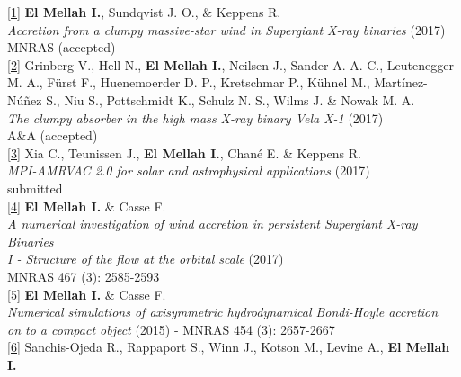 \begin{flushleft}

\href{http://adsabs.harvard.edu/abs/2017arXiv171108709E}{[1]} \textbf{El Mellah I.}, Sundqvist J. O., \& Keppens R. \\ 
\emph{Accretion from a clumpy massive-star wind in Supergiant X-ray binaries} (2017) \\
MNRAS (accepted)\\
\vspace*{0.3cm}
\href{http://adsabs.harvard.edu/abs/2017arXiv171106743G}{[2]} Grinberg V., Hell N., \textbf{El Mellah I.}, Neilsen J., Sander A. A. C., Leutenegger M. A., F\"{u}rst F., Huenemoerder D. P., Kretschmar P., K\"{u}hnel M., Mart\'{i}nez-N\'{u}\~{n}ez S., Niu S., Pottschmidt K., Schulz N. S., Wilms J. \& Nowak M. A.\\ 
\emph{The clumpy absorber in the high mass X-ray binary Vela X-1} (2017) \\
A\&A (accepted)\\
\vspace*{0.3cm}
\href{https://arxiv.org/abs/1710.06140}{[3]} Xia C., Teunissen J., \textbf{El Mellah I.}, Chan\'e E. \& Keppens R. \\ 
\emph{MPI-AMRVAC 2.0 for solar and astrophysical applications} (2017) \\
submitted\\
\vspace*{0.3cm}
\href{https://academic.oup.com/mnras/article/467/3/2585/2961795/A-numerical-investigation-of-wind-accretion-in}{[4]} \textbf{El Mellah I.} \& Casse F. \\ 
\emph{A numerical investigation of wind accretion in persistent Supergiant X-ray Binaries}\\
\emph{I - Structure of the flow at the orbital scale} (2017)\\
MNRAS 467 (3): 2585-2593\\
\vspace*{0.3cm}
\href{https://academic.oup.com/mnras/article-lookup/doi/10.1093/mnras/stv2184}{[5]} \textbf{El Mellah I.} \& Casse F. \\ 
\emph{Numerical simulations of axisymmetric hydrodynamical Bondi-Hoyle accretion}\\
\emph{on to a compact object} (2015) - MNRAS 454 (3): 2657-2667\\
\vspace*{0.3cm}
\href{http://iopscience.iop.org/article/10.1088/0004-637X/787/1/47/meta}{[6]} Sanchis-Ojeda R., Rappaport S., Winn J., Kotson M., Levine A., \textbf{El Mellah I.}\\

\end{flushleft}

